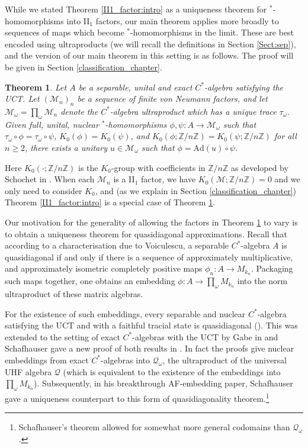 \documentclass[reqno]{amsart}
\newtheorem{mainthm}{Theorem}
\theoremstyle{definition}
\theoremstyle{remark}
\numberwithin{equation}{section}
\theoremstyle{definition}
\begin{document}
While we stated Theorem \ref{II1_factor:intro} as a uniqueness theorem for $^*$-homomorphisms into II$_1$ factors, our main theorem applies more broadly to sequences of maps which become $^*$-homomorphisms in the limit. These are best encoded using ultraproducts (we will recall the definitions in Section \ref{Sect:sep}), and the version of our main theorem in this setting is as follows. The proof will be given in Section \ref{classification_chapter}. 

\begin{mainthm}\label{intro:ultraproductthm}
Let $A$ be a separable, unital and exact $C^*$-algebra satisfying the UCT. Let $(\mathcal M_n)_{n}$ be a sequence of finite von Neumann factors, and let $\mathcal M_\omega=\prod_\omega \mathcal M_n$ denote the $C^*$-algebra ultraproduct which has a unique trace $\tau_\omega$.  Given full, unital, nuclear $^*$-homomorphisms $\phi, \psi: A\rightarrow \mathcal M_\omega$ such that $\tau_{\omega} \circ \phi = \tau_{\omega} \circ \psi$, $K_0(\phi) = K_0(\psi)$, and $K_0(\phi;\mathbb Z/n\mathbb Z)=K_0(\psi;\mathbb Z/n\mathbb Z)$ for all $n\geq 2$, there exists a unitary $u \in \mathcal M_\omega$ such that $\phi = \text{Ad} (u) \circ \psi$. 
\end{mainthm} 

Here $K_0(\cdot;\mathbb Z/n\mathbb Z)$ is the $K_0$-group with coefficients in $\mathbb Z/n\mathbb Z$ as developed by Schochet in \cite{Schochet:PJM}.  When each $\mathcal M_n$ is a II$_1$ factor, we have $K_0(\mathcal M;\mathbb Z/n\mathbb Z)=0$ and we only need to consider $K_0$, and (as we explain in Section \ref{classification_chapter}) Theorem \ref{II1_factor:intro} is a special case of Theorem \ref{intro:ultraproductthm}. 

Our motivation for the generality of allowing the factors in Theorem \ref{intro:ultraproductthm} to vary is to obtain a uniqueness theorem for quasidiagonal approximations. Recall that according to a characterisation due to Voiculescu, a separable $C^*$-algebra $A$ is quasidiagonal if and only if there is a sequence of approximately multiplicative, and approximately isometric completely positive maps $\phi_n\colon A\to M_{k_n}$. Packaging such maps together, one obtains an embedding $\phi\colon A\rightarrow\prod_{\omega}M_{k_n}$ into the norm ultraproduct of these matrix algebras. 

For the existence of such embeddings, every separable and nuclear $C^*$-algebra satisfying the UCT and with a faithful tracial state is quasidiagonal (\cite{TWW:Annals}). This was extended to the setting of exact $C^*$-algebras with the UCT by Gabe in \cite{Gabe:JFA} and Schafhauser gave a new proof of both  results in \cite{new-TWW}. In fact the proofs give nuclear embeddings from exact $C^*$-algebras into $\mathcal Q_\omega$, the ultraproduct of the universal UHF algebra $\mathcal Q$ (which is equivalent to the existence of the embeddings into $\prod_{\omega}M_{k_n}$). Subsequently, in his breakthrough AF-embedding paper, Schafhauser gave a uniqueness counterpart to this form of quasidiagonality theorem.\footnote{Schafhauser's theorem allowed for somewhat more general codomains than $\mathcal Q_\omega$.} 
\end{document}
